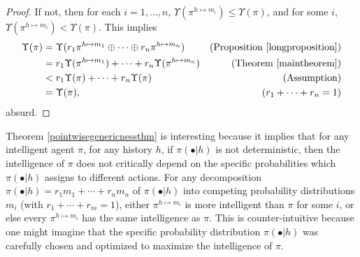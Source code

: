\documentclass[runningheads]{llncs}
\begin{document}
\begin{proof}
    If not, then for each $i=1,\ldots,n$, $\Upsilon(\pi^{h\mapsto m_i})\leq\Upsilon(\pi)$,
    and for some $i$, $\Upsilon(\pi^{h\mapsto m_i})<\Upsilon(\pi)$.
    This implies
    \begin{align*}
        \Upsilon(\pi)
            &= \Upsilon(r_1\pi^{h\mapsto m_1}\oplus\cdots\oplus r_n\pi^{h\mapsto m_n})
                &\mbox{(Proposition \ref{longproposition})}\\
            &= r_1\Upsilon(\pi^{h\mapsto m_1})+\cdots+r_n\Upsilon(\pi^{h\mapsto m_n})
                &\mbox{(Theorem \ref{maintheorem})}\\
            &< r_1\Upsilon(\pi)+\cdots+r_n\Upsilon(\pi)
                &\mbox{(Assumption)}\\
            &= \Upsilon(\pi),
                &\mbox{($r_1+\cdots+r_n=1$)}
    \end{align*}
    absurd.
\end{proof}

Theorem \ref{pointwisegenericnessthm} is interesting because it implies that for
any intelligent agent $\pi$, for any history $h$, if $\pi(\bullet|h)$ is not deterministic,
then the intelligence of $\pi$ does not critically depend on the specific probabilities
which $\pi(\bullet|h)$ assigns to different actions. For any decomposition
$\pi(\bullet|h)=r_1m_1+\cdots+r_nm_n$ of $\pi(\bullet|h)$ into competing probability
distributions $m_i$ (with $r_1+\cdots+r_m=1$), either $\pi^{h\mapsto m_i}$ is more intelligent
than $\pi$ for some $i$, or else every $\pi^{h\mapsto m_i}$ has the same intelligence as
$\pi$. This is counter-intuitive because one might imagine that the specific probability
distribution $\pi(\bullet|h)$ was carefully chosen and optimized to maximize the intelligence
of $\pi$.
\end{document}
